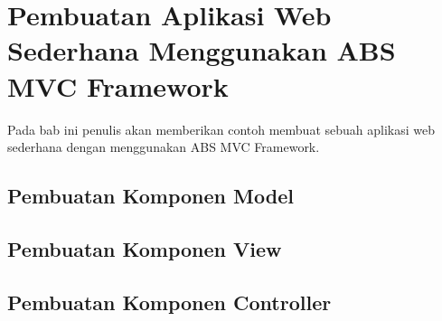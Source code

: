 \chapter{Pembuatan Aplikasi Web Sederhana Menggunakan ABS MVC Framework}

Pada bab ini penulis akan memberikan contoh membuat sebuah aplikasi web sederhana dengan menggunakan ABS MVC Framework.

\section{Pembuatan Komponen Model}
\section{Pembuatan Komponen View}
\section{Pembuatan Komponen Controller}